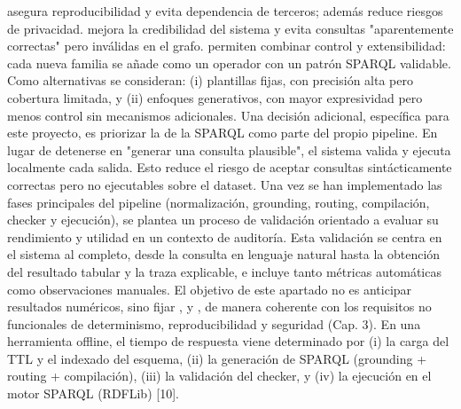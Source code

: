 \markdownRendererUlItem {} asegura reproducibilidad y evita dependencia de terceros; además reduce riesgos de privacidad.\markdownRendererUlItemEnd 
\markdownRendererUlItem {} mejora la credibilidad del sistema y evita consultas "aparentemente correctas" pero inválidas en el grafo.\markdownRendererUlItemEnd 
\markdownRendererUlItem {} permiten combinar control y extensibilidad: cada nueva familia se añade como un operador con un patrón SPARQL validable.\markdownRendererUlItemEnd 
\markdownRendererUlEndTight \markdownRendererInterblockSeparator
{}Como alternativas se consideran: (i) plantillas fijas, con precisión alta pero cobertura limitada, y (ii) enfoques generativos, con mayor expresividad pero menos control sin mecanismos adicionales.\markdownRendererInterblockSeparator
{}Una decisión adicional, específica para este proyecto, es priorizar la  de la SPARQL como parte del propio pipeline. En lugar de detenerse en "generar una consulta plausible", el sistema valida y ejecuta localmente cada salida. Esto reduce el riesgo de aceptar consultas sintácticamente correctas pero no ejecutables sobre el dataset.\markdownRendererInterblockSeparator
{}\markdownRendererInterblockSeparator
{}Una vez se han implementado las fases principales del pipeline (normalización, grounding, routing, compilación, checker y ejecución), se plantea un proceso de validación orientado a evaluar su rendimiento y utilidad en un contexto de auditoría. Esta validación se centra en el sistema al completo, desde la consulta en lenguaje natural hasta la obtención del resultado tabular y la traza explicable, e incluye tanto métricas automáticas como observaciones manuales.\markdownRendererInterblockSeparator
{}El objetivo de este apartado no es anticipar resultados numéricos, sino fijar ,  y , de manera coherente con los requisitos no funcionales de determinismo, reproducibilidad y seguridad (Cap. 3).\markdownRendererInterblockSeparator
{}\markdownRendererInterblockSeparator
{}En una herramienta offline, el tiempo de respuesta viene determinado por (i) la carga del TTL y el indexado del esquema, (ii) la generación de SPARQL (grounding + routing + compilación), (iii) la validación del checker, y (iv) la ejecución en el motor SPARQL (RDFLib) [10].\markdownRendererInterblockSeparator
